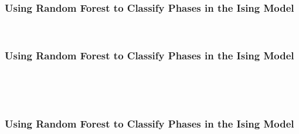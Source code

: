 \documentclass[11pt]{article}
\begin{document}
    \begin{center}
    \end{center}
    { \hspace*{\fill} \\}

\newpage
\hypertarget{using-random-forest-to-classify-phases-in-the-ising-model}{%
\subsubsection{Using Random Forest to Classify Phases in the Ising
Model}\label{using-random-forest-to-classify-phases-in-the-ising-model}}

    \begin{center}
    \end{center}
    { \hspace*{\fill} \\}

\newpage
\hypertarget{using-random-forest-to-classify-phases-in-the-ising-model}{%
\subsubsection{Using Random Forest to Classify Phases in the Ising
Model}\label{using-random-forest-to-classify-phases-in-the-ising-model2}}

    \begin{center}
    \end{center}
    { \hspace*{\fill} \\}

    \begin{center}
    \end{center}
    { \hspace*{\fill} \\}

\newpage
\hypertarget{using-random-forest-to-classify-phases-in-the-ising-model}{%
\subsubsection{Using Random Forest to Classify Phases in the Ising
Model}\label{using-random-forest-to-classify-phases-in-the-ising-model3}}
    \begin{center}
    \end{center}
    { \hspace*{\fill} \\}
\end{document}
